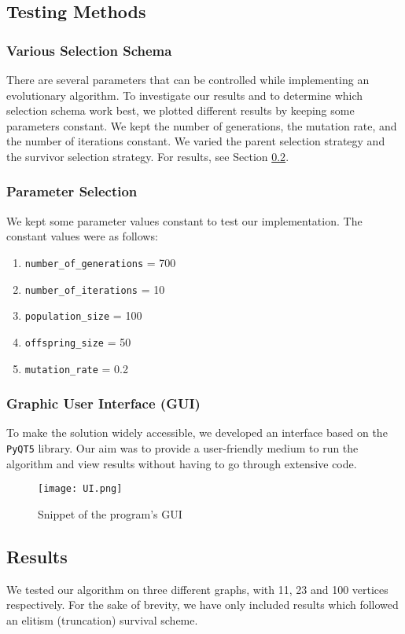 \documentclass[conference,compsoc]{IEEEtran}
\begin{document}
\subsection{Testing Methods}
\subsubsection{Various Selection Schema} There are several parameters that can be 
controlled while implementing an evolutionary algorithm. 
To investigate our results and to determine which selection schema work best, 
we plotted different results by keeping some parameters constant. We kept the number of
generations, the mutation rate, and the number of iterations constant. We varied the parent selection strategy and the 
survivor selection strategy. For results, see Section \ref{results}.

\subsubsection{Parameter Selection}  We kept some parameter values constant to test our implementation. The constant 
values were as follows:
\begin{enumerate}
  \item \texttt{number\_of\_generations} = 700
  \item \texttt{number\_of\_iterations} = 10
  \item \texttt{population\_size} = 100
  \item \texttt{offspring\_size} = 50
  \item \texttt{mutation\_rate} = 0.2 
\end{enumerate}

\subsubsection{Graphic User Interface (GUI)} To make the solution widely accessible, we developed an interface 
based on the \texttt{PyQT5} library. Our aim was to provide a user-friendly medium to run the algorithm and 
view results without having to go through extensive code.
\begin{figure}[h]
    \centering
    \texttt{[image: UI.png]}
    \caption{Snippet of the program's GUI}
    \label{fig:my_label}
\end{figure}

\subsection{Results} \label{results}
We tested our algorithm on three different graphs, with 11, 23 and 100 vertices respectively. 
For the sake of brevity, we have only included results which followed an elitism (truncation) survival scheme. 
\end{document}

